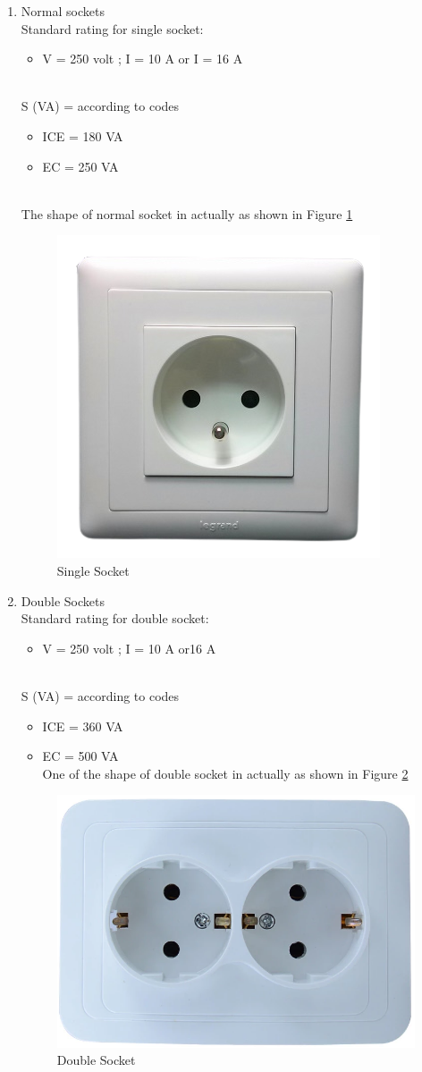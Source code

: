 \documentclass[12pt,fleqn]{book} %
\begin{document}
\begin{enumerate}
    \item Normal sockets
    \\Standard rating for single socket:
    \begin{itemize}
        \item V = 250 volt ; I = 10 A or I = 16 A
    \end{itemize}
    \\S (VA) = according to codes
    \begin{itemize}
        \item  ICE = 180 VA
        \item EC = 250 VA
    \end{itemize}
    \\The shape of normal socket in actually as shown in Figure \ref{fig:s 1}
       \begin{figure}[h!]
    \centering
    \includegraphics[width=0.3\linewidth]{s 1.png}
    \caption{Single Socket  }
    \label{fig:s 1}
\end{figure}


\newpage
    \item Double Sockets 
    \\Standard rating for double socket:
    \begin{itemize}
        \item V = 250 volt ; I = 10 A or16 A
    \end{itemize}
    \\S (VA) = according to codes
    \begin{itemize}
        \item  ICE = 360 VA
        \item EC = 500 VA
        \\One of the shape of double socket in actually as shown in  Figure \ref{fig:s 2}
    \end{itemize}
       \begin{figure}[h!]
    \centering
    \includegraphics[width=0.7\linewidth]{s 2.png}
    \caption{   Double Socket  }
    \label{fig:s 2}
\end{figure}
    

\end{enumerate}
\end{document}
